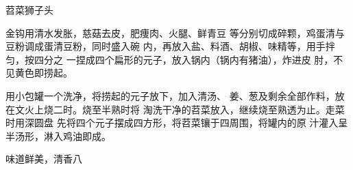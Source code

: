 \begin{recipe}{苕菜狮子头}

\ingredients



\cooking

\step 	金钩用清水发胀，慈菇去皮，肥痩肉、火腿、鲜青豆 等分别切成碎颗，鸡蛋清与豆粉调成蛋清豆粉，同时盛入碗 内，再放入盐、料酒、胡椒、味精等，用手拌匀，按四分之 一捏成四个扁形的元子，放入锅内（锅内有猪油），炸进皮 肘，不见黄色即捞起。

\step 	用小包罐一个洗净，将捞起的元子放下，加入清汤、 姜、葱及剩余全部作料，放在文火上烧二时。烧至半熟时将 淘洗干净的苕菜放入，继续烧至熟透为止。走菜时用深圆盘 先将四个元子摆成四方形，将苕菜镶于四周围，将罐内的原 汁灌入呈半汤形，淋入鸡油即成。

\notes

味道鲜美，清香八

\end{recipe}

